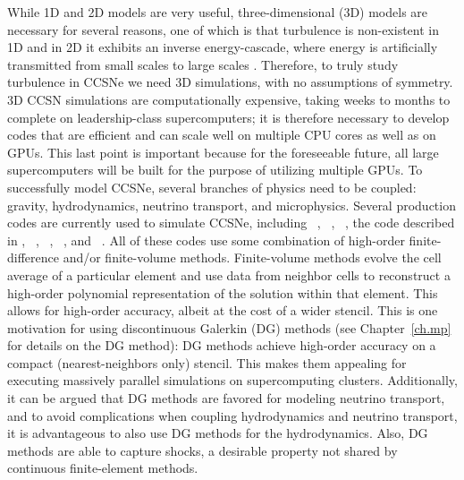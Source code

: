 While 1D and 2D models are very useful,
three-dimensional (3D) models are necessary for several reasons,
one of which is that turbulence is non-existent in 1D and in 2D it
exhibits an inverse energy-cascade, where energy is artificially transmitted
from small scales to large scales \citep{k1967}.
Therefore, to truly study turbulence in CCSNe we need 3D simulations,
with no assumptions of symmetry.
3D CCSN simulations are computationally expensive,
taking weeks to months to complete
on leadership-class supercomputers; it is therefore
necessary to develop codes that are efficient and can scale well on
multiple CPU cores as well as on GPUs.
This last point is important because for the foreseeable future, all
large supercomputers will be built for the purpose of utilizing
multiple GPUs.
To successfully model CCSNe, several branches of physics need to be coupled:
gravity, hydrodynamics, neutrino transport, and microphysics.
Several production codes are currently used to simulate CCSNe, including
\flashx\ \citep{for2000,dwo2022},
\cocov\ \citep{mjd2010},
\zelmani\ \citep{oao2012},
the code described in \citet{ktk2016},
\fornax\ \citep{sdb2019},
\nadafld\ \citep{rjj2019},
\chimera\ \citep{bbh2020},
and \gmunu\ \citep{cht2023}.
All of these codes use some combination of high-order finite-difference
and/or finite-volume methods.
Finite-volume methods \citep[e.g., see][]{l2002} evolve the cell average
of a particular element and use data from neighbor cells to reconstruct
a high-order polynomial representation of the solution within that element.
This allows for high-order accuracy, albeit at the cost of a wider stencil.
This is one motivation for using discontinuous Galerkin (DG) methods
(see Chapter~\ref{ch.mp} for details on the DG method):
DG methods achieve high-order accuracy on a compact (nearest-neighbors only)
stencil.
This makes them appealing for executing massively parallel simulations on
supercomputing clusters.
Additionally, it can be argued that DG methods are favored for
modeling neutrino transport,
and to avoid complications when coupling hydrodynamics and neutrino transport,
it is advantageous to also use DG methods for the hydrodynamics.
Also, DG methods are able to capture shocks,
a desirable property not shared by continuous finite-element methods.

